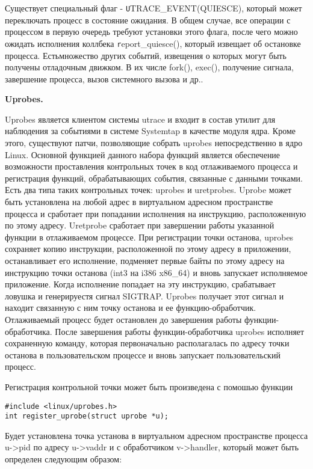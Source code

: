 \bigskip 
Существует специальный флаг - {\texttt UTRACE\_EVENT(QUIESCE)}, который может переключать процесс в состояние ожидания. В общем случае, все операции с процессом в первую очередь требуют установки этого флага, после чего можно ожидать исполнения коллбека {\texttt report\_quiesce()}, который извещает об остановке процесса. Естьмножество других событий, извещения о которых могут быть получены отладочным движком. В их числе fork(), exec(), получение сигнала, завершение процесса, вызов системного вызова и др..

\bigskip
{\bfseries Uprobes.}

\bigskip
Uprobes является клиентом системы utrace и входит в состав утилит для наблюдения за событиями в системе Systemtap в качестве модуля ядра. Кроме этого, существуют патчи, позволяющие собрать uprobes непосредственно в ядро Linux. Основной функцией данного набора функций является обеспечение возможности проставления контрольных точек в код отлаживаемого процесса и регистрация функций, обрабатывающих события, связанные с данными точками. Есть два типа таких контрольных точек: uprobes и uretprobes. Uprobe может быть установлена на любой адрес в виртуальном адресном пространстве процесса и сработает при попадании исполнения на инструкцию, расположенную по этому адресу. Uretprobe сработает при завершении работы указанной функции в отлаживаемом процессе. При регистрации точки останова, uprobes сохраняет копию инструкции, расположенной по этому адресу в приложении, останавливает его исполнение, подменяет первые байты по этому адресу на инструкцию точки останова (int3 на i386 x86\_64) и вновь запускает исполняемое приложение. Когда исполнение попадает на эту инструкцию, срабатывает ловушка и генерируестя сигнал SIGTRAP. Uprobes получает этот сигнал и находит связанную с ним точку останова и ее функцию-обработчик. Отлаживаемый процесс будет остановлен до завершения работы функции-обработчика. После завершения работы функции-обработчика uprobes исполняет сохраненную команду, которая первоначально располагалась по адресу точки останова в пользовательском процессе и вновь запускает пользовательский процесс.   

Регистрация контрольной точки может быть произведена с помошью функции 

\bigskip 
\begin{lstlisting}
#include <linux/uprobes.h>
int register_uprobe(struct uprobe *u); 
\end{lstlisting}

Будет установлена точка установа в виртуальном адресном пространстве процесса u->pid по адресу u->vaddr и с обработчиком v->handler, который может быть определен следующим образом: 

